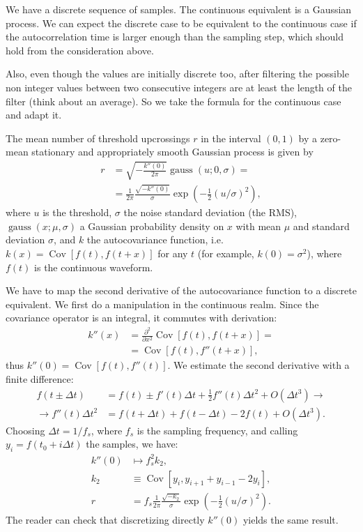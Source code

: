 We have a discrete sequence of samples. The continuous equivalent is a Gaussian
process. We can expect the discrete case to be equivalent to the continuous
case if the autocorrelation time is larger enough than the sampling step, which
should hold from the consideration above.

Also, even though the values are initially discrete too, after filtering the
possible non integer values between two consecutive integers are at least the
length of the filter (think about an average). So we take the formula for the
continuous case and adapt it.

The mean number of threshold upcrossings $r$ in the interval $(0,1)$ by a
zero-mean stationary and appropriately smooth Gaussian process is given by
\cite[81]{rasmussen2006}
%
\begin{align}
    r &= \sqrt{-\frac{k''(0)}{2\pi}} \operatorname{gauss}(u;0,\sigma) = \\
      &= \frac 1 {2\pi} \frac {\sqrt{-k''(0)}} \sigma
         \exp \left( -\frac12 (u/\sigma)^2 \right),
\end{align}
%
where $u$ is the threshold, $\sigma$ the noise standard deviation (the RMS),
$\operatorname{gauss}(x;\mu,\sigma)$ a Gaussian probability density on $x$ with
mean $\mu$ and standard deviation $\sigma$, and $k$ the autocovariance
function, i.e.\ $k(x) = \operatorname{Cov}[f(t), f(t+x)]$ for any $t$ (for
example, $k(0) = \sigma^2$), where $f(t)$ is the continuous waveform.

We have to map the second derivative of the autocovariance function to a
discrete equivalent. We first do a manipulation in the continuous realm. Since
the covariance operator is an integral, it commutes with derivation:
%
\begin{align}
    k''(x)
    &= \frac{\partial^2}{\partial x^2} \operatorname{Cov}[f(t), f(t+x)] = \\
    &= \operatorname{Cov}[f(t), f''(t+x)],
\end{align}
%
thus $k''(0) = \operatorname{Cov}[f(t), f''(t)]$. We estimate the second
derivative with a finite difference:
%
\begin{align}
    f(t \pm \Delta t)
    &= f(t) \pm f'(t) \Delta t + \frac12 f''(t) \Delta t^2 + O(\Delta t^3)
    \rightarrow \\
    \rightarrow f''(t) \Delta t^2 &=
    f(t + \Delta t) + f(t - \Delta t) - 2 f(t) + O(\Delta t^3).
\end{align}
%
Choosing $\Delta t = 1/f_s$, where $f_s$ is the sampling frequency, and calling
$y_i = f(t_0 + i\Delta t)$ the samples, we have:
\begin{align}
    k''(0) &\mapsto f_s^2 k_2, \\
    k_2 &\equiv \operatorname{Cov}[y_i, y_{i+1}+y_{i-1}-2y_i], \label{eq:k2} \\
    r &= f_s \frac 1 {2\pi} \frac {\sqrt{-k_2}} \sigma
         \exp \left( -\frac12 (u/\sigma)^2 \right).
    \label{eq:rcont}
\end{align}
%
The reader can check that discretizing directly $k''(0)$ yields the same result.

